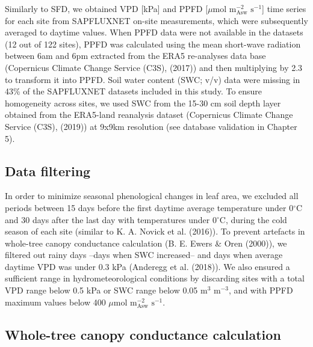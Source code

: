 \documentclass[11pt,twoside]{reedthesis}
\begin{document}
Similarly to SFD, we obtained VPD {[}kPa{]} and PPFD {[}\(\mu\)mol
\(\text{m}^{-2}_{\text{Asw}}\) \(\text{s}^{-1}\){]} time series for each
site from SAPFLUXNET on-site measurements, which were subsequently
averaged to daytime values. When PPFD data were not available in the
datasets (12 out of 122 sites), PPFD was calculated using the mean
short-wave radiation between 6am and 6pm extracted from the ERA5
re-analyses data base (Copernicus Climate Change Service (C3S), (2017))
and then multiplying by 2.3 to transform it into PPFD. Soil water
content (SWC; v/v) data were missing in 43\% of the SAPFLUXNET datasets
included in this study. To ensure homogeneity across sites, we used SWC
from the 15-30 cm soil depth layer obtained from the ERA5-land
reanalysis dataset (Copernicus Climate Change Service (C3S), (2019)) at
9x9km resolution (see database validation in Chapter 5).\par

\subsection{Data filtering}\label{data-filtering}

In order to minimize seasonal phenological changes in leaf area, we
excluded all periods between 15 days before the first daytime average
temperature under 0\(^{\circ}\)C and 30 days after the last day with
temperatures under 0\(^{\circ}\)C, during the cold season of each site
(similar to K. A. Novick et al. (2016)). To prevent artefacts in
whole-tree canopy conductance calculation (B. E. Ewers \& Oren (2000)),
we filtered out rainy days --days when SWC increased-- and days when
average daytime VPD was under 0.3 kPa (Anderegg et al. (2018)). We also
ensured a sufficient range in hydrometeorological conditions by
discarding sites with a total VPD range below 0.5 kPa or SWC range below
0.05 \(\text{m}^{3}\) \(\text{m}^{-3}\), and with PPFD maximum values
below 400 \(\mu\)mol \(\text{m}^{-2}_{\text{Asw}}\)
\(\text{s}^{-1}\).\par

\subsection{Whole-tree canopy conductance
calculation}\label{whole-tree-canopy-conductance-calculation}
\end{document}

